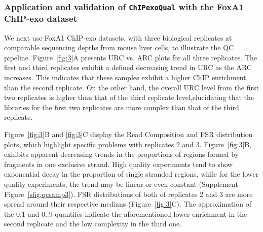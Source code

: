 \documentclass{bmcart}
\newcommand{\pname}[1]{\texttt{ChIPexoQual}}
\newcommand{\SK}[1]{\textcolor{red}{SK: #1}}
\begin{document}
\subsubsection*{Application and validation of \pname{} with the FoxA1
  ChIP-exo dataset}

We next use FoxA1 ChIP-exo datasets, with three biological replicates at comparable sequencing depths from mouse liver cells, to illustrate the QC pipeline.  Figure~\ref{fig:3}A presents URC vs. ARC plots for all three replicates. The first and third replicates exhibit a defined decreasing trend in URC as the ARC increases. This indicates that these samples exhibit a higher ChIP enrichment than the second replicate. On the other hand, the overall URC level from the first two replicates is higher than that of the third replicate level,elucidating that the libraries for the first two replicates are more complex than that of the third replicate.

Figure~\ref{fig:3}B and \ref{fig:3}C display the Read Composition and FSR distribution plots, which highlight specific problems with replicates 2 and 3. Figure~\ref{fig:3}B, exhibits apparent decreasing trends in the proportions of regions formed by fragments in one exclusive strand. High quality experiments tend to show exponential decay in the proportion of single   stranded regions, while for the lower quality experiments, the trend may be linear or even constant (Supplement   Figure~\ref{sfig:qcsamp3}). FSR distributions of both of replicates 2 and 3 are more spread around their respective medians (Figure~\ref{fig:3}C). The approximation of the 0.1 and 0..9 quantiles indicate the aforementioned lower enrichment in the   second replicate and the low complexity in the third one.
\end{document}
